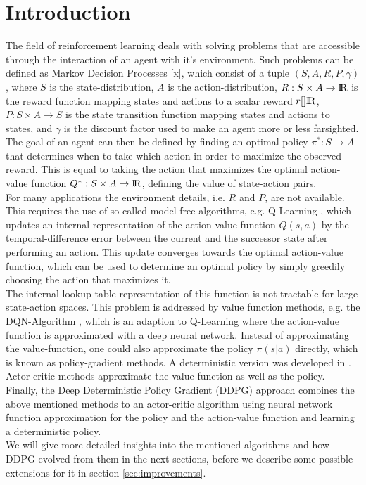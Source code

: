 \section{Introduction}
\label{sec:intro}
The field of reinforcement learning deals with solving problems that are accessible through the interaction of an agent with it's environment. Such problems can be defined as Markov Decision Processes [x], which consist of a tuple $(S, A, R, P, \gamma)$, where $S$ is the state-distribution, $A$ is the action-distribution, $R:S\times A\rightarrow {\rm I\!R}$ is the reward function mapping states and actions to a scalar reward $r[]{\rm I\!R}$, $P:S\times  A \rightarrow S$ is the state transition function mapping states and actions to states, and $\gamma$ is the discount factor used to make an agent more or less farsighted.\\
The goal of an agent can then be defined by finding an optimal policy $\pi^*:S\rightarrow A$ that determines when to take which action in order to maximize the observed reward. This is equal to taking the action that maximizes the optimal action-value function $Q^*:S \times A \rightarrow {\rm I\!R}$, defining the value of state-action pairs.\\ 
For many applications the environment details, i.e. $R$ and $P$, are not available. This requires the use of so called model-free algorithms, e.g. Q-Learning \citep{watkins1992q}, which updates an internal representation of the action-value function $Q(s,a)$ by the temporal-difference error between the current and the successor state after performing an action. This update converges towards the optimal action-value function, which can be used to determine an optimal policy by simply greedily choosing the action that maximizes it.\\ 
The internal lookup-table representation of this function is not tractable for large state-action spaces. This problem is addressed by value function methods, e.g. the DQN-Algorithm \citep{mnih2013playing}, which is an adaption to Q-Learning where the action-value function is approximated with a deep neural network. Instead of approximating the value-function, one could also approximate the policy $\pi(s|a)$ directly, which is known as policy-gradient methods. A deterministic version was developed in \citep{silver2014deterministic}. Actor-critic methods \citep{konda2000actor} approximate the value-function as well as the policy.\\
Finally, the Deep Deterministic Policy Gradient (DDPG) approach \citep{lillicrap2015continuous} combines the above mentioned methods to an actor-critic algorithm using neural network function approximation for the policy and the action-value function and learning a deterministic policy.\\
We will give more detailed insights into the mentioned algorithms and how DDPG evolved from them in the next sections, before we describe some possible extensions for it in section \ref{sec:improvements}.

